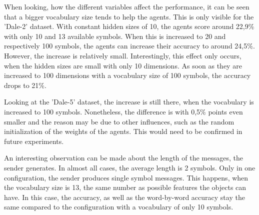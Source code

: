 When looking, how the different variables affect the performance, it can be seen that a bigger vocabulary size tends to help the agents.
This is only visible for the 'Dale-2' dataset.
With constant hidden sizes of 10, the agents score around 22,9\% with only 10 and 13 available symbols.
When this is increased to 20 and respectively 100 symbols, the agents can increase their accuracy to around 24,5\%.
However, the increase is relatively small.
Interestingly, this effect only occurs, when the hidden sizes are small with only 10 dimensions.
As soon as they are increased to 100 dimensions with a vocabulary size of 100 symbols, the accuracy drops to 21\%.

Looking at the 'Dale-5' dataset, the increase is still there, when the vocabulary is increased to 100 symbols.
Nonetheless, the difference is with 0,5\% points even smaller and the reason may be due to other influences, such as the random initialization of the weights of the agents.
This would need to be confirmed in future experiments.

An interesting observation can be made about the length of the messages, the sender generates.
In almost all cases, the average length is 2 symbols.
Only in one configuration, the sender produces single symbol messages.
This happens, when the vocabulary size is 13, the same number as possible features the objects can have.
In this case, the accuracy, as well as the word-by-word accuracy stay the same compared to the configuration with a vocabulary of only 10 symbols.


